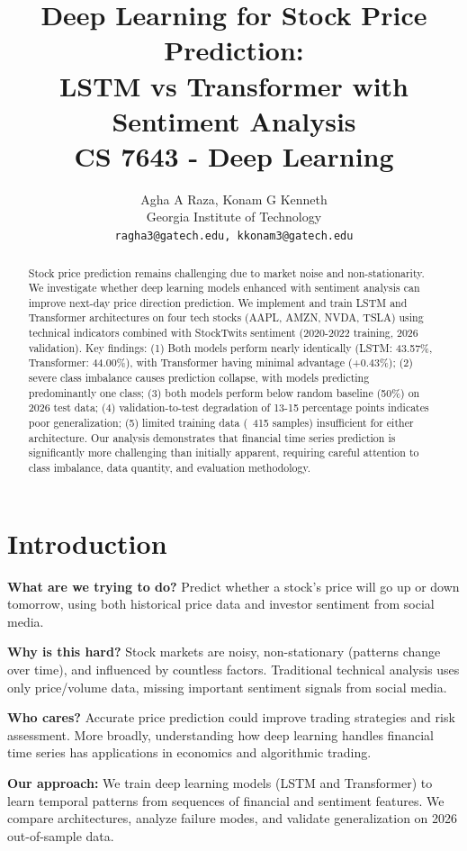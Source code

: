 \documentclass[10pt,twocolumn]{article}
\title{\textbf{Deep Learning for Stock Price Prediction:\\LSTM vs Transformer with Sentiment Analysis} \\[0.5em]
\large CS 7643 - Deep Learning}
\author{Agha A Raza, Konam G Kenneth \\
Georgia Institute of Technology \\
\texttt{ragha3@gatech.edu, kkonam3@gatech.edu}}
\date{}
\begin{document}
\maketitle

\begin{abstract}
\small
Stock price prediction remains challenging due to market noise and non-stationarity. We investigate whether deep learning models enhanced with sentiment analysis can improve next-day price direction prediction. We implement and train LSTM and Transformer architectures on four tech stocks (AAPL, AMZN, NVDA, TSLA) using technical indicators combined with StockTwits sentiment (2020-2022 training, 2026 validation). Key findings: (1) Both models perform nearly identically (LSTM: 43.57\%, Transformer: 44.00\%), with Transformer having minimal advantage (+0.43\%); (2) severe class imbalance causes prediction collapse, with models predicting predominantly one class; (3) both models perform below random baseline (50\%) on 2026 test data; (4) validation-to-test degradation of 13-15 percentage points indicates poor generalization; (5) limited training data (~415 samples) insufficient for either architecture. Our analysis demonstrates that financial time series prediction is significantly more challenging than initially apparent, requiring careful attention to class imbalance, data quantity, and evaluation methodology.
\end{abstract}

\section{Introduction}

\textbf{What are we trying to do?} Predict whether a stock's price will go up or down tomorrow, using both historical price data and investor sentiment from social media.

\textbf{Why is this hard?} Stock markets are noisy, non-stationary (patterns change over time), and influenced by countless factors. Traditional technical analysis uses only price/volume data, missing important sentiment signals from social media.

\textbf{Who cares?} Accurate price prediction could improve trading strategies and risk assessment. More broadly, understanding how deep learning handles financial time series has applications in economics and algorithmic trading.

\textbf{Our approach:} We train deep learning models (LSTM and Transformer) to learn temporal patterns from sequences of financial and sentiment features. We compare architectures, analyze failure modes, and validate generalization on 2026 out-of-sample data.
\end{document}
